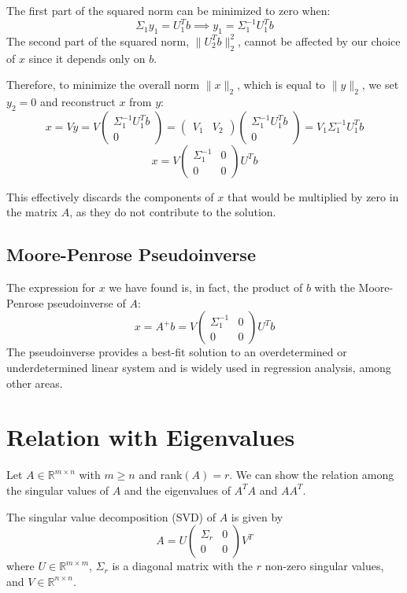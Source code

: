 The first part of the squared norm can be minimized to zero when:
\[
\Sigma_1 y_1 = U_1^T b \implies y_1 = \Sigma_1^{-1} U_1^T b
\]
The second part of the squared norm, $\| U_2^T b \|_2^2$, cannot be affected by our choice of $x$ since it depends only on $b$. 

Therefore, to minimize the overall norm $\| x \|_2$, which is equal to $\| y \|_2$, we set $y_2 = 0$ and reconstruct $x$ from $y$:
\[ x = Vy = V\begin{pmatrix} \Sigma_1^{-1} U_1^T b \\ 0 \end{pmatrix} = \begin{pmatrix} V_1 & V_2 \end{pmatrix} \begin{pmatrix} \Sigma_1^{-1} U_1^T b \\ 0 \end{pmatrix} = V_1 \Sigma_1^{-1} U_1^T b \]
\[ x = V \begin{pmatrix} \Sigma_1^{-1} & 0 \\ 0 & 0 \end{pmatrix} U^T b \]

This effectively discards the components of $x$ that would be multiplied by zero in the matrix $A$, as they do not contribute to the solution.

\subsection*{Moore-Penrose Pseudoinverse}
The expression for $x$ we have found is, in fact, the product of $b$ with the Moore-Penrose pseudoinverse of $A$:
\[
x = A^+ b = V \begin{pmatrix} \Sigma_1^{-1} & 0 \\ 0 & 0 \end{pmatrix} U^T b
\]
The pseudoinverse provides a best-fit solution to an overdetermined or underdetermined linear system and is widely used in regression analysis, among other areas.

\section{Relation with Eigenvalues}

Let $ A \in \mathbb{R}^{m \times n} $ with $ m \geq n $ and rank$(A) = r$. We can show the relation among the singular values of $A$ and the eigenvalues of $A^TA$ and $AA^T$.

The singular value decomposition (SVD) of $A$ is given by
\[ A = U \begin{pmatrix}
\Sigma_r & 0 \\
0 & 0 
\end{pmatrix} V^T \]
where $ U \in \mathbb{R}^{m \times m} $, $\Sigma_r$ is a diagonal matrix with the $r$ non-zero singular values, and $ V \in \mathbb{R}^{n \times n} $.

